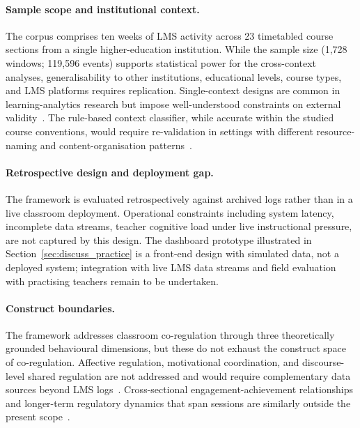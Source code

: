 \documentclass[preprint,12pt,authoryear]{elsarticle}
\begin{document}
\paragraph{Sample scope and institutional context.}
The corpus comprises ten weeks of LMS activity across 23 timetabled course sections from a single higher-education institution. While the sample size (1{,}728 windows; 119{,}596 events) supports statistical power for the cross-context analyses, generalisability to other institutions, educational levels, course types, and LMS platforms requires replication. Single-context designs are common in learning-analytics research but impose well-understood constraints on external validity~\citep{drugova2024, viberg2020, kwame2023, cerrattopargman2021}. The rule-based context classifier, while accurate within the studied course conventions, would require re-validation in settings with different resource-naming and content-organisation patterns~\citep{lockyer2013, rotelli2023}.

\paragraph{Retrospective design and deployment gap.}
The framework is evaluated retrospectively against archived logs rather than in a live classroom deployment. Operational constraints including system latency, incomplete data streams, teacher cognitive load under live instructional pressure, are not captured by this design. The dashboard prototype illustrated in Section~\ref{sec:discuss_practice} is a front-end design with simulated data, not a deployed system; integration with live LMS data streams and field evaluation with practising teachers remain to be undertaken.

\paragraph{Construct boundaries.}
The framework addresses classroom co-regulation through three theoretically grounded behavioural dimensions, but these do not exhaust the construct space of co-regulation. Affective regulation, motivational coordination, and discourse-level shared regulation are not addressed and would require complementary data sources beyond LMS logs~\citep{nguyen2023, saqr2023}. Cross-sectional engagement-achievement relationships and longer-term regulatory dynamics that span sessions are similarly outside the present scope~\citep{lopezpernas2024}.
\end{document}
